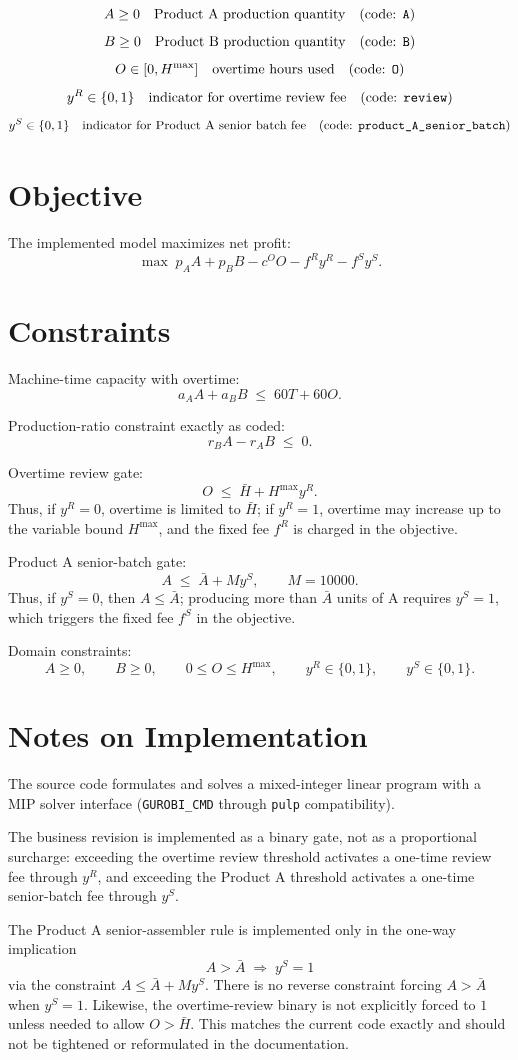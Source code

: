 \[
A \ge 0
\quad\text{Product A production quantity}
\quad\text{(code: \texttt{A})}
\]
\[
B \ge 0
\quad\text{Product B production quantity}
\quad\text{(code: \texttt{B})}
\]
\[
O \in [0,H^{\max}]
\quad\text{overtime hours used}
\quad\text{(code: \texttt{O})}
\]
\[
y^R \in \{0,1\}
\quad\text{indicator for overtime review fee}
\quad\text{(code: \texttt{review})}
\]
\[
y^S \in \{0,1\}
\quad\text{indicator for Product A senior batch fee}
\quad\text{(code: \texttt{product\_A\_senior\_batch})}
\]

\section*{Objective}

The implemented model maximizes net profit:
\[
\max \;
p_A A + p_B B - c^O O - f^R y^R - f^S y^S.
\]

\section*{Constraints}

Machine-time capacity with overtime:
\[
a_A A + a_B B \;\le\; 60T + 60O.
\]

Production-ratio constraint exactly as coded:
\[
r_B A - r_A B \;\le\; 0.
\]

Overtime review gate:
\[
O \;\le\; \bar H + H^{\max} y^R.
\]
Thus, if \(y^R=0\), overtime is limited to \(\bar H\); if \(y^R=1\), overtime may increase up to the variable bound \(H^{\max}\), and the fixed fee \(f^R\) is charged in the objective.

Product A senior-batch gate:
\[
A \;\le\; \bar A + M y^S,
\qquad M=10000.
\]
Thus, if \(y^S=0\), then \(A \le \bar A\); producing more than \(\bar A\) units of A requires \(y^S=1\), which triggers the fixed fee \(f^S\) in the objective.

Domain constraints:
\[
A \ge 0,\qquad B \ge 0,\qquad 0 \le O \le H^{\max},
\qquad y^R \in \{0,1\},\qquad y^S \in \{0,1\}.
\]

\section*{Notes on Implementation}

The source code formulates and solves a mixed-integer linear program with a MIP solver interface (\texttt{GUROBI\_CMD} through \texttt{pulp} compatibility).

The business revision is implemented as a binary gate, not as a proportional surcharge: exceeding the overtime review threshold activates a one-time review fee through \(y^R\), and exceeding the Product A threshold activates a one-time senior-batch fee through \(y^S\).

The Product A senior-assembler rule is implemented only in the one-way implication
\[
A > \bar A \;\Rightarrow\; y^S=1
\]
via the constraint \(A \le \bar A + My^S\). There is no reverse constraint forcing \(A>\bar A\) when \(y^S=1\). Likewise, the overtime-review binary is not explicitly forced to \(1\) unless needed to allow \(O>\bar H\). This matches the current code exactly and should not be tightened or reformulated in the documentation.
